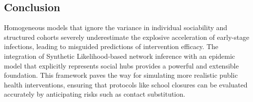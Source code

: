 \subsection{Conclusion}
Homogeneous models that ignore the variance in individual sociability and structured cohorts severely underestimate the explosive acceleration of early-stage infections, leading to misguided predictions of intervention efficacy.
The integration of Synthetic Likelihood-based network inference with an epidemic model that explicitly represents social hubs provides a powerful and extensible foundation.
This framework paves the way for simulating more realistic public health interventions, ensuring that protocols like school closures can be evaluated accurately by anticipating risks such as contact substitution.